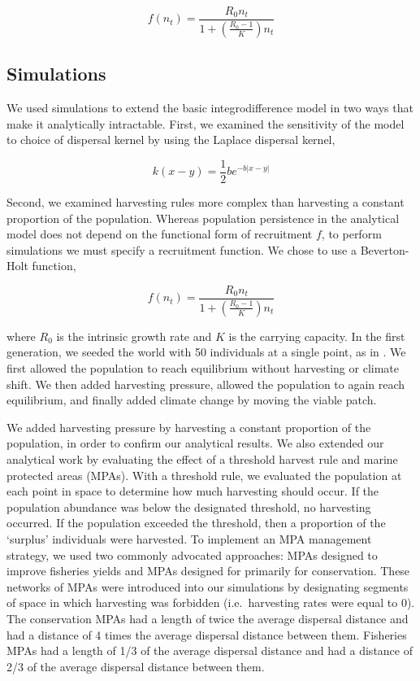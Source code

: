 \documentclass[]{article}
\begin{document}
\[f(n_t)=\frac{R_0n_t}{1+\left(\frac{R_0-1}{K}\right)n_t}\]


\subsection{Simulations }

We used simulations to extend the basic integrodifference model in two ways that make it analytically 
intractable. First, we examined the sensitivity of the model to choice of dispersal kernel by using the Laplace 
dispersal kernel, 

\[ k(x-y)=\frac{1}{2}be^{-b|x-y|}\]

\noindent Second, we examined harvesting rules more complex than harvesting a constant proportion of the population. Whereas population persistence in the analytical model does not depend on the functional form of recruitment $f$, to perform simulations we must 
specify a recruitment function.  We chose to use a Beverton-Holt function,

\[f(n_t)=\frac{R_0n_t}{1+\left(\frac{R_0-1}{K}\right)n_t}\]

\noindent where $R_0$ is the intrinsic growth rate and $K$ is the carrying capacity.  In the first generation, we seeded the world with 50 individuals at a single point, as in 
\citep{ZhouKot2011}. We first allowed the population to reach equilibrium without harvesting or climate shift.  We then 
added harvesting pressure, allowed the population to again reach equilibrium, and finally added climate 
change by moving the viable patch.

We added harvesting pressure by harvesting a constant proportion of the population, in order to confirm our analytical results. 
We also extended our analytical work by evaluating the effect of a threshold harvest rule and marine protected 
areas (MPAs). With a threshold rule, we evaluated the population at each point in space to determine how 
much harvesting should occur. If the population abundance was below the designated threshold, no 
harvesting occurred. If the population exceeded the threshold, then a proportion of the `surplus' individuals 
were harvested. To implement an MPA management strategy, we used two commonly advocated approaches: 
MPAs designed to improve fisheries yields and MPAs designed for primarily for conservation. These networks 
of MPAs were introduced into our simulations by designating segments of space in which harvesting was 
forbidden (i.e.~harvesting rates were equal to $0$). The conservation MPAs had a length of twice the average 
dispersal distance and had a distance of 4 times the average dispersal distance between them. Fisheries MPAs had a length of 1/3 of the 
average dispersal distance and had a distance of 2/3 of the average dispersal distance between them.
\end{document}
